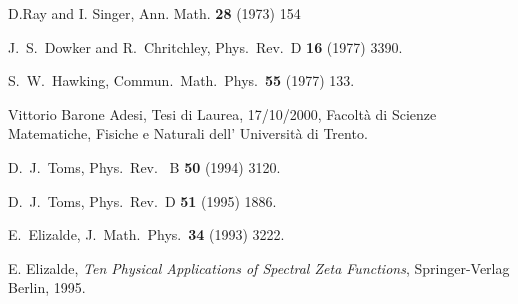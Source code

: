 \documentclass [11pt]{article}
\begin{document}
\begin{thebibliography}{10}
D.Ray and I. Singer,
Ann. Math. {\bf 28} (1973) 154

J.~S.~Dowker and R.~Chritchley,
Phys.\ Rev.\ D {\bf 16} (1977) 3390.

S.~W.~Hawking,
Commun.\ Math.\ Phys.\  {\bf 55} (1977) 133.


Vittorio Barone Adesi, Tesi di Laurea, 17/10/2000, 
Facolt\`a di Scienze Matematiche, Fisiche e Naturali dell' Universit\`a di
Trento.


D.~J.~Toms,
Phys.\ Rev. \ B {\bf 50} (1994) 3120.


D.~J.~Toms,
Phys.\ Rev.\ D {\bf 51} (1995) 1886.

E.~Elizalde,
J.\ Math.\ Phys.\  {\bf 34} (1993) 3222.


E. Elizalde, 
\emph{Ten Physical Applications of Spectral Zeta Functions}, Springer-Verlag 
Berlin, 1995.


\end{thebibliography}
\end{document}
